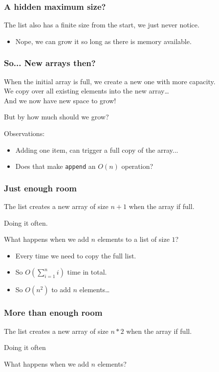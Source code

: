 \begin{frame}
	\frametitle{A hidden maximum size?}
		The list also has a finite size from the start, we just never notice.
		\begin{itemize}
			\item Nope, we can grow it so long as there is memory available.
		\end{itemize}
\end{frame}

\begin{frame}
	\frametitle{So... New arrays then?}
		When the initial array is full, we create a new one with more capacity.\\
		We copy over all existing elements into the new array\dots\\
		And we now have new space to grow!
	
		But by how much should we grow?	
	
	Observations:
		\begin{itemize}
			\item Adding one item, can trigger a full copy of the array...
			\item Does that make \texttt{append} an $O(n)$ operation?
		\end{itemize}
\end{frame}

\begin{frame}
	\frametitle{Just enough room}
		The list creates a new array of size $n+1$ when the array if full.
		
		Doing it often.
	
		What happens when we add $n$ elements to a list of size $1$?
		
		\begin{itemize}
			\item Every time we need to copy the full list.
			\item So $O(\sum\limits_{i=1}^{n}i)$ time in total.
			\item So $O(n^2)$ to add $n$ elements\dots
		\end{itemize}
\end{frame}

\begin{frame}
	\frametitle{More than enough room}
		The list creates a new array of size $n*2$ when the array if full.
		
		Doing it often
	
		What happens when we add $n$ elements?
\end{frame}

